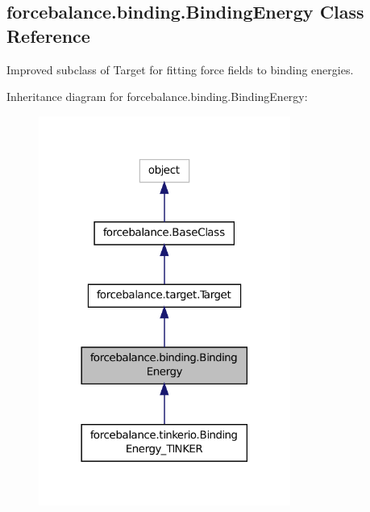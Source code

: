 \hypertarget{classforcebalance_1_1binding_1_1BindingEnergy}{\subsection{forcebalance.\-binding.\-Binding\-Energy Class Reference}
\label{classforcebalance_1_1binding_1_1BindingEnergy}
}


Improved subclass of Target for fitting force fields to binding energies.  




Inheritance diagram for forcebalance.\-binding.\-Binding\-Energy\-:\nopagebreak
\begin{figure}[H]
\begin{center}
\leavevmode
\includegraphics[width=234pt]{classforcebalance_1_1binding_1_1BindingEnergy__inherit__graph}
\end{center}
\end{figure}


